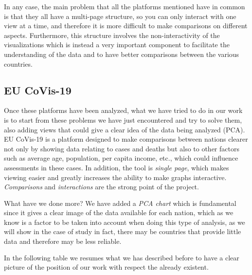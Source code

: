 \documentclass[10pt,conference]{IEEEtran}
\begin{document}
In any case, the main problem that all the platforms mentioned have in common is that they all have a multi-page structure, so you 
can only interact with one view at a time, and therefore it is more difficult to make comparisons on different aspects. Furthermore, 
this structure involves the non-interactivity of the visualizations which is instead a very important component to facilitate the 
understanding of the data and to have better comparisons between the various countries.

\subsection{EU CoVis-19}
Once these platforms have been analyzed, what we have tried to do in our work is to start from these problems we have just encountered 
and try to solve them, also adding views that could give a clear idea of the data being analyzed (PCA). EU CoVis-19 is a platform 
designed to make comparisons between nations clearer not only by showing data relating to cases and deaths but also to other factors 
such as average age, population, per capita income, etc., which could influence assessments in these cases. In addition, the tool is 
{\em single page}, which makes viewing easier and greatly increases the ability to make graphs interactive. {\em Comparisons} and {\em interactions} are 
the strong point of the project.

What have we done more? We have added a {\em PCA chart} which is fundamental since it gives a clear image of the data available for 
each nation, which as we know is a factor to be taken into account when doing this type of analysis, as we will show in the case of study 
in fact, there may be countries that provide little data and therefore may be less reliable.

In the following table we resumes what we has described before to have a clear picture of the position of our work with respect the already existent.

\begin{figure}
\end{figure}
\end{document}
